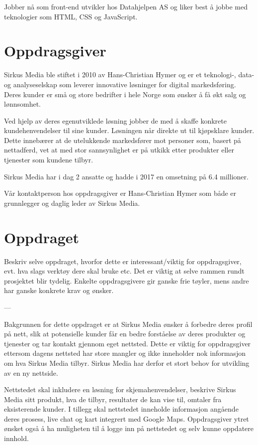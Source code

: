 \documentclass[11pt,a4paper]{report}
\begin{document}
Jobber nå som front-end utvikler hos Datahjelpen AS og liker best å jobbe med teknologier som HTML, CSS og JavaScript.

\section*{Oppdragsgiver}

Sirkus Media ble stiftet i 2010 av Hans-Christian Hymer og er et teknologi-, data- og analyseselskap som leverer innovative løsninger for digital markedsføring. Deres kunder er små og store bedrifter i hele Norge som ønsker å få økt salg og lønnsomhet. 

Ved hjelp av deres egenutviklede løsning jobber de med å skaffe konkrete kundehenvendelser til sine kunder. Løsningen når direkte ut til kjøpsklare kunder. Dette innebærer at de utelukkende markedsfører mot personer som, basert på nettadferd, vet at med stor sannsynlighet er på utkikk etter produkter eller tjenester som kundene tilbyr.

Sirkus Media har i dag 2 ansatte og hadde i 2017 en omsetning på 6.4 millioner.

Vår kontaktperson hos oppdragsgiver er Hans-Christian Hymer som både er grunnlegger og daglig leder av Sirkus Media. 

\section*{Oppdraget}

Beskriv selve oppdraget, hvorfor dette er interessant/viktig for oppdragsgiver, evt. hva slags verktøy dere skal bruke etc. Det er viktig at selve rammen rundt prosjektet blir tydelig. Enkelte oppdragsgivere gir ganske frie tøyler, mens andre har ganske konkrete krav og ønsker.

---

Bakgrunnen for dette oppdraget er at Sirkus Media ønsker å forbedre deres profil på nett, slik at potensielle kunder får en bedre forståelse av deres produkter og tjenester og tar kontakt gjennom eget nettsted. Dette er viktig for oppdragsgiver ettersom dagens nettsted har store mangler og ikke inneholder nok informasjon om hva Sirkus Media tilbyr. Sirkus Media har derfor et stort behov for utvikling av en ny nettside. 

Nettstedet skal inkludere en løsning for skjemahenvendelser, beskrive Sirkus Media sitt produkt, hva de tilbyr, resultater de kan vise til, omtaler fra eksisterende kunder.
I tillegg skal nettstedet inneholde informasjon angående deres prosess, live chat og kart integrert med Google Maps. Oppdragsgiver ytret ønsket også å ha muligheten til å logge inn på nettstedet og selv kunne oppdatere innhold.
\end{document}
